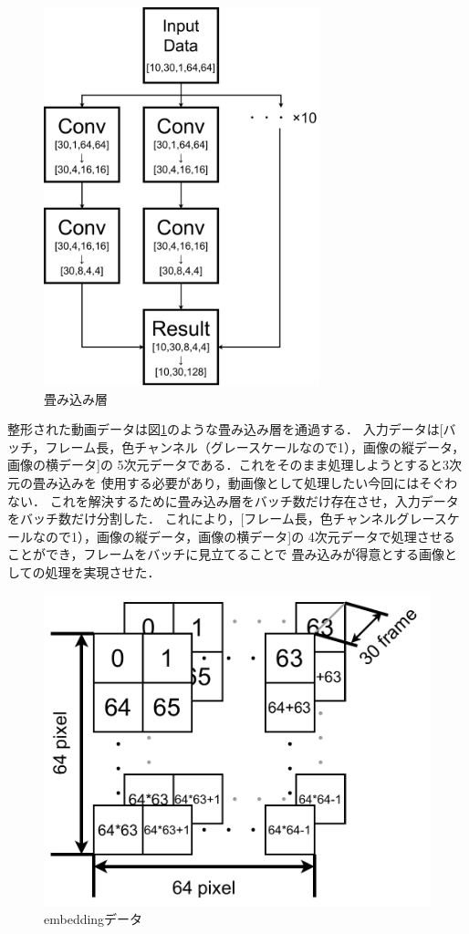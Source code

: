\begin{figure}[t]
  \begin{center}
    \includegraphics[width=80mm]{images/chart/conv.pdf}
  \end{center}
  \caption{畳み込み層}
  \label{conv}
\end{figure}

整形された動画データは図\ref{conv}のような畳み込み層を通過する．
入力データは[バッチ，フレーム長，色チャンネル（グレースケールなので1），画像の縦データ，画像の横データ]の
5次元データである．これをそのまま処理しようとすると3次元の畳み込みを
使用する必要があり，動画像として処理したい今回にはそぐわない．
これを解決するために畳み込み層をバッチ数だけ存在させ，入力データをバッチ数だけ分割した．
これにより，[フレーム長，色チャンネルグレースケールなので1），画像の縦データ，画像の横データ]の
4次元データで処理させることができ，フレームをバッチに見立てることで
畳み込みが得意とする画像としての処理を実現させた．
\clearpage

\begin{figure}[t]
  \begin{center}
    \includegraphics[width=120mm]{images/chart/embedding.pdf}
  \end{center}
  \caption{embeddingデータ}
  \label{embedding}
\end{figure}

